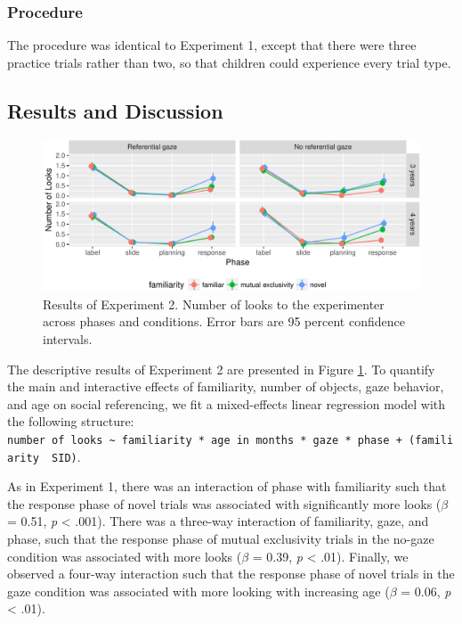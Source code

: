 \documentclass[10pt, letterpaper]{article}
\newenvironment{CodeChunk}{}{}
\begin{document}
\subsubsection{Procedure}\label{procedure-1}

The procedure was identical to Experiment 1, except that there were
three practice trials rather than two, so that children could experience
every trial type.

\subsection{Results and Discussion}\label{results-and-discussion-1}

\begin{CodeChunk}
\begin{figure}[h]

{\centering \includegraphics{figs/results_e2-1} 

}

\caption[Results of Experiment 2]{Results of Experiment 2. Number of looks to the experimenter across phases and conditions. Error bars are 95 percent confidence intervals.}\label{fig:results_e2}
\end{figure}
\end{CodeChunk}

The descriptive results of Experiment 2 are presented in Figure
\ref{fig:results_e2}. To quantify the main and interactive effects of
familiarity, number of objects, gaze behavior, and age on social
referencing, we fit a mixed-effects linear regression model with the
following structure:
\texttt{number\ of\ looks\ \textasciitilde{}\ familiarity\ *\ age\ in\ months\ *\ gaze\ *\ phase\ +\ (familiarity\ \textbar{}\ SID)}.

As in Experiment 1, there was an interaction of phase with familiarity
such that the response phase of novel trials was associated with
significantly more looks (\(\beta\) = 0.51, \emph{p} \textless{} .001).
There was a three-way interaction of familiarity, gaze, and phase, such
that the response phase of mutual exclusivity trials in the no-gaze
condition was associated with more looks (\(\beta\) = 0.39, \emph{p}
\textless{} .01). Finally, we observed a four-way interaction such that
the response phase of novel trials in the gaze condition was associated
with more looking with increasing age (\(\beta\) = 0.06, \emph{p}
\textless{} .01).
\end{document}
